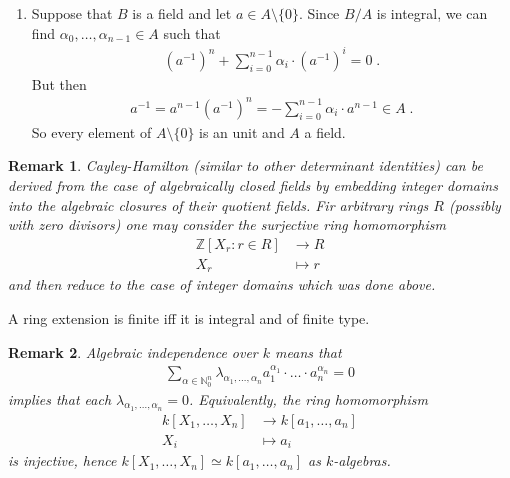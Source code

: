 \documentclass[DIV=14,parskip=full,pointednumbers]{scrartcl}
\newenvironment{alphanumerate}{\begin{enumerate}[label={$(\alph*)$},ref=\curthm]}{\end{enumerate}}
\theoremstyle{cthm}
\theoremstyle{cvarthm}
\renewenvironment{proof}[1][\proofname]
{\pushQED{\qed}\topsep0pt \partopsep0pt\trivlist\item[\hskip\labelsep\itshape #1.] }{\popQED\endtrivlist\addvspace{6pt plus 6pt}}
\theoremstyle{cdef}
\newtheorem{rem}{Remark}[subsection]
\newcommand{\IN}{\mathbb{N}}
\newcommand{\IZ}{\mathbb{Z}}
\newcommand{\longto}{\longrightarrow}
\newcommand{\ldotspam}{,\ldots,}
\begin{document}
\begin{proof}
\begin{alphanumerate}
			\item Suppose that $B$ is a field and let $a\in A \setminus\{0\}$. Since $B/A$ is integral, we can find $\alpha_0\ldotspam \alpha_{n-1}\in A$ such that 
			\begin{align*}
			\left(a^{-1}\right)^n+\sum_{i=0}^{n-1}\alpha_i\cdot\left(a^{-1}\right)^i = 0\;.
			\end{align*}
			But then 
			\begin{align*}
			a^{-1} = a^{n-1}\left(a^{-1}\right)^n = -\sum_{i=0}^{n-1} \alpha_i\cdot a^{n-1} \in A\;.
			\end{align*}
			So every element of $A\setminus\{0\}$ is an unit and $A$ a field.
		\end{alphanumerate}
		
		
	\end{proof}
	\begin{rem}
		Cayley-Hamilton (similar to other determinant identities) can be derived from the case of algebraically closed fields by embedding integer domains into the algebraic closures of their quotient fields. Fir arbitrary rings $R$ (possibly with zero divisors) one may consider the surjective ring homomorphism
		\begin{align*}
		\IZ[X_r: r\in R] &\longto R\\
		X_r &\longmapsto r
		\end{align*}
		and then reduce to the case of integer domains which was done above.
		
	\end{rem}
	
	\begin{cor}
		A ring extension is finite iff it is integral and of finite type.
	\end{cor}
	\begin{rem}
		Algebraic independence over $k$ means that
		\begin{align*}
		\sum_{\alpha\in \IN_0^n} \lambda_{\alpha_1\ldotspam \alpha_n} a_1^{\alpha_1}\cdot\ldots\cdot a_n^{\alpha_n}=0
		\end{align*}
		implies that each $\lambda_{\alpha_1\ldotspam \alpha_n}=0$. Equivalently, the ring homomorphism 
		\begin{align*}
		k[X_1,\ldots, X_n]&\longto k[a_1,\ldots, a_n]\\
		X_i&\longmapsto a_i
		\end{align*}
		is injective, hence $k[X_1,\ldots, X_n]\simeq k[a_1,\ldots, a_n]$ as $k$-algebras.
	\end{rem}
	
\end{document}
